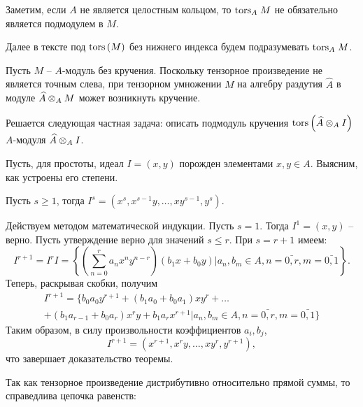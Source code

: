     Заметим, если $A$ не является целостным кольцом, то $\textup{tors}_{A}\;M$ не обязательно является подмодулем
    в $M$.

    Далее в тексте под $\textup{tors}\left(M\right)$ без нижнего индекса будем подразумевать $\textup{tors}_{A}\;M$.

    Пусть $M$ -- $A$-модуль без кручения. Поскольку тензорное произведение не является точным слева, 
    при тензорном умножении $M$ на алгебру раздутия $\widehat{A}$ в модуле $\widehat{A} \otimes_A M$ 
    может возникнуть кручение. 

    Решается следующая частная задача: описать подмодуль кручения $\textup{tors}\left(\widehat{A} \otimes_A I\right)$ 
    $A$-модуля $\widehat{A} \otimes_A I$.

    Пусть, для простоты, идеал $I = (x, y)$ порожден элементами $x, y \in A$. Выясним, как устроены
    его степени. 

    \begin{Theorem}
        Пусть $s \geq 1$, тогда $I^s = (x^s, x^{s-1}y, \dots, xy^{s-1}, y^s)$.
    \end{Theorem}
    \begin{Proof}
        Действуем методом математической индукции. Пусть $s = 1$. Тогда $I^1 = (x, y)$ -- верно. Пусть утверждение
        верно для значений $s \leq r$. При $s = r + 1$ имеем:
        \begin{equation*}
            I^{r + 1} = I^{r}I = \left\{\left(\sum_{n = 0}^{r} a_nx^ny^{n - r}\right)(b_1x + b_0y) 
            \Bigg| a_n, b_m \in A, n = \bar{0, r}, m = \bar{0, 1}\right\}.
        \end{equation*}
        Теперь, раскрывая скобки, получим
        \begin{multline*}
            I^{r + 1} = \{ b_0a_0y^{r + 1} + (b_1a_0 + b_0a_1)xy^{r} + \dots \\+ 
                (b_1a_{r - 1} + b_0a_{r})x^ry + b_1a_rx^{r + 1}  | a_n, b_m \in A, n = \bar{0, r}, m = \bar{0, 1} \}
        \end{multline*}
        Таким образом, в силу произвольности коэффициентов $a_i, b_j$,
        \begin{equation*}
            I^{r + 1} = (x^{r + 1}, x^ry, \dots, xy^r, y^{r + 1}),
        \end{equation*}
        что завершает доказательство теоремы.
    \end{Proof}

    Так как тензорное произведение дистрибутивно относительно прямой суммы,
    то справедлива цепочка равенств:

